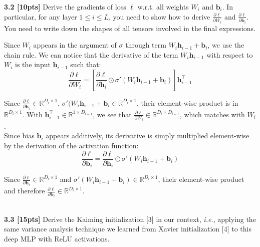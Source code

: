 \documentclass{article}
\begin{document}
\noindent
\textbf{3.2 [10pts]} Derive the gradients of loss $\ell$ w.r.t. all weights $W_i$ and $\textbf{b}_i$. In particular, for any layer $1 \leq i \leq L$, you need to show how to derive $\frac{\partial \ell}{\partial W_i}$ and $\frac{\partial \ell}{\partial \textbf{b}_i}$. You need to write down the shapes of all tensors involved in the final expressions.\\

{\color{blue}
Since $W_i$ appears in the argument of $\sigma$ through term $W_i \textbf{h}_{i-1}+ \textbf{b}_i$, we use the chain rule. We can notice that the derivative of the term $W_i \textbf{h}_{i-1}$ with respect to $W_i$ is the input $\textbf{h}_{i-1}$ such that:
\begin{equation}
    \frac{\partial \ell}{\partial W_i}= \left[\frac{\partial \ell}{\partial \textbf{h}_i} \odot \sigma ' (W_i \textbf{h}_{i-1}+ \textbf{b}_i) \right] \textbf{h}_{i-1}^{\top}
\end{equation}

Since $\frac{\partial \ell}{\partial \textbf{h}_i} \in \mathbb{R}^{D_i \times 1}$, $\sigma ' (W_i \textbf{h}_{i-1}+ \textbf{b}_i \in \mathbb{R}^{D_i \times 1}$, their element-wise product is in $\mathbb{R}^{D_i \times 1}$. With $\textbf{h}_{i-1}^{\top} \in \mathbb{R}^{1 \times D_{i-1}}$, we see that $\frac{\partial \ell}{\partial W_i} \in \mathbb{R}^{D_i \times D_{i-1}}$, which matches with $W_i$. \\

Since bias $\textbf{b}_i$ appears additively, its derivative is simply multiplied element-wise by the derivation of the activation function:
\begin{equation}
    \frac{\partial \ell}{\partial \textbf{b}_i}= \frac{\partial \ell}{\partial \textbf{h}_i} \odot \sigma '(W_i \textbf{h}_{i-1}+ \textbf{b}_i)
\end{equation}

Since $\frac{\partial \ell}{\partial \textbf{h}_i} \in \mathbb{R}^{D_i \times 1}$ and $\sigma '(W_i \textbf{h}_{i-1}+ \textbf{b}_i) \in \mathbb{R}^{D_i \times 1}$, their element-wise product and therefore $\frac{\partial \ell}{\partial \textbf{b}_i} \in \mathbb{R}^{D_i \times 1}$. 
}\\

\noindent
\textbf{3.3 [15pts]} Derive the Kaiming initialization [3] in our context, \textit{i.e.}, applying the same variance analysis technique we learned from Xavier initialization [4] to this deep MLP with ReLU activations.\\
\end{document}
